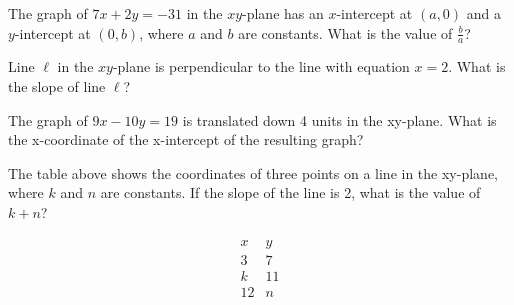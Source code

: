 \vspace{2em}
\noindent\markforreview

\vspace{1em}

The graph of \( 7x + 2y = -31 \) in the \( xy \)-plane has an \( x \)-intercept at \( (a, 0) \) and a \( y \)-intercept at \( (0, b) \), where \( a \) and \( b \) are constants. What is the value of \( \frac{b}{a} \)?

\vspace{0.75em}


\newpage
\noindent\markforreview

\vspace{1em}

Line $\ell$ in the $xy$-plane is perpendicular to the line with equation $x = 2$. What is the slope of line $\ell$?

\vspace{0.75em}



\vspace{5em}
\noindent\markforreview

\vspace{1em}

The graph of \( 9x - 10y = 19 \) is translated down 4 units in the xy-plane. What is the x-coordinate of the x-intercept of the resulting graph?


\vspace{5em}
\newpage
\noindent\markforreview

\vspace{1em}

The table above shows the coordinates of three points on a line in the xy-plane, where \( k \) and \( n \) are constants. If the slope of the line is 2, what is the value of \( k + n \)?

\[
\begin{array}{c|c}
x & y \\
\hline
3 & 7 \\
k & 11 \\
12 & n \\
\end{array}
\]

\vspace{5em}

